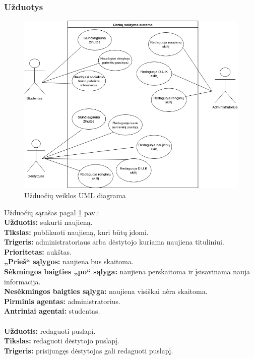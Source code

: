 \documentclass{VUMIFPSkursinis}
\begin{document}
\subsubsection{Užduotys}
\begin{figure}[H]
\centering
\includegraphics[width=\linewidth]{img/DVS.png}
\caption{Užduočių veiklos UML diagrama}
\label{fig:dvs}
\end{figure}
Užduočių sąrašas pagal \ref{fig:dvs} pav.:\\
\textbf{Užduotis:} sukurti naujieną. \\
\textbf{Tikslas:} publikuoti naujieną, kuri būtų įdomi.\\
\textbf{Trigeris:} administratoriaus arba dėstytojo kuriama naujiena tituliniui. \\
\textbf{Prioritetas:} aukštas. \\
\textbf{„Prieš“ sąlygos:} naujiena bus skaitoma.\\
\textbf{Sėkmingos baigties „po“ sąlyga:} naujiena perskaitoma ir įsisavinama nauja informacija. \\
\textbf{Nesėkmingos baigties sąlyga:} naujiena visiškai nėra skaitoma. \\
\textbf{Pirminis agentas:} administratorius. \\
\textbf{Antriniai agentai:} studentas. \\
\\
\textbf{Užduotis:} redaguoti puslapį. \\
\textbf{Tikslas:} redaguoti dėstytojo puslapį.\\
\textbf{Trigeris:} prisijungęs dėstytojas gali redaguoti puslapį. \\
\end{document}
